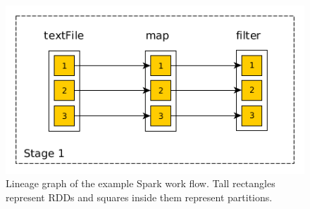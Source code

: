 \begin{figure}[!htbp]
	\centering
	\includegraphics[scale=0.75]{images/spark_dag.png}
	\caption{Lineage graph of the example Spark work flow. Tall rectangles represent RDDs and squares inside them represent partitions.}
	\label{figure:spark-example-dag}
\end{figure}    